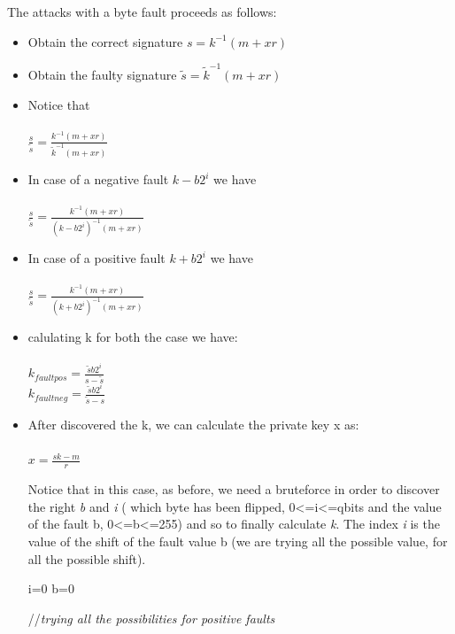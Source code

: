 \documentclass[11pt,english]{article}
\begin{document}
The attacks with a byte fault proceeds as follows: 
\begin{itemize}
\item Obtain the correct signature $s = k^{-1}(m + xr) $
\item Obtain the faulty signature $\tilde{s} = \tilde{k}^{-1}(m + xr)$
\item Notice that \\\\$\frac{s}{\tilde{s}}  = \frac{k^{-1}(m+xr)}{\tilde{k}^{-1}(m+xr)}$

\item In case of a negative fault $k-b2^{i} $ we have\\\\ $\frac{s}{\tilde{s}} = \frac{k^{-1}(m+xr)}{(k-b2^{i})^{-1}(m+xr)}$

\item In case of a positive fault $k+b2^{i} $ we have \\\\$\frac{s}{\tilde{s}} = \frac{k^{-1}(m+xr)}{(k+b2^{i})^{-1}(m+xr)}$


\item calulating k for both the case we have: \\\\$k_{faultpos} = \frac{\tilde{s}b2^{i}}{s-\tilde{s}}$ \\
$k_{faultneg} = \frac{\tilde{s}b2^{i}}{\tilde{s}-s}$ \\

\item After discovered the k, we can calculate the private key x as:\\\\ $x = \frac{sk - m}{r}$

Notice that in this case, as before, we need a bruteforce in order to discover the right \textit{b} and \textit{i} ( which byte has been flipped, 0<=i<=qbits and the value of the fault b, 0<=b<=255) and so to finally calculate \textit{k}. The index \textit{i} is the value of the shift of the fault value b (we are trying all the possible value, for all the possible shift).

\begin{algorithm}[H]
  
  i=0\;
  b=0\;
  
  //\textit{trying all the possibilities for positive faults}\;


\end{algorithm}
\end{itemize}
\end{document}
